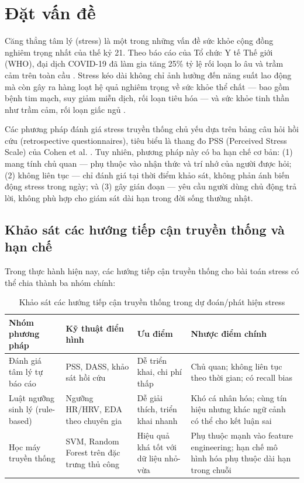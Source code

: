 \section{Đặt vấn đề}
\label{sec:dat_van_de}

Căng thẳng tâm lý (stress) là một trong những vấn đề sức khỏe cộng đồng nghiêm trọng nhất của thế kỷ 21. Theo báo cáo của Tổ chức Y tế Thế giới (WHO), đại dịch COVID-19 đã làm gia tăng 25\% tỷ lệ rối loạn lo âu và trầm cảm trên toàn cầu \cite{who2022mental}. Stress kéo dài không chỉ ảnh hưởng đến năng suất lao động mà còn gây ra hàng loạt hệ quả nghiêm trọng về sức khỏe thể chất — bao gồm bệnh tim mạch, suy giảm miễn dịch, rối loạn tiêu hóa — và sức khỏe tinh thần như trầm cảm, rối loạn giấc ngủ \cite{chrousos2009stress}.

Các phương pháp đánh giá stress truyền thống chủ yếu dựa trên bảng câu hỏi hồi cứu (retrospective questionnaires), tiêu biểu là thang đo PSS (Perceived Stress Scale) của Cohen et al. \cite{cohen1983global}. Tuy nhiên, phương pháp này có ba hạn chế cơ bản: (1) mang tính chủ quan — phụ thuộc vào nhận thức và trí nhớ của người được hỏi; (2) không liên tục — chỉ đánh giá tại thời điểm khảo sát, không phản ánh biến động stress trong ngày; và (3) gây gián đoạn — yêu cầu người dùng chủ động trả lời, không phù hợp cho giám sát dài hạn trong đời sống thường nhật.

\subsection{Khảo sát các hướng tiếp cận truyền thống và hạn chế}
\label{subsec:traditional_approaches}

Trong thực hành hiện nay, các hướng tiếp cận truyền thống cho bài toán stress có thể chia thành ba nhóm chính:

\begin{table}[H]
\centering
\caption{Khảo sát các hướng tiếp cận truyền thống trong dự đoán/phát hiện stress}
\label{tab:traditional_methods_stress}
\small
\begin{tabular}{|p{3.2cm}|p{3.8cm}|p{2.8cm}|p{4.0cm}|}
\hline
\textbf{Nhóm phương pháp} & \textbf{Kỹ thuật điển hình} & \textbf{Ưu điểm} & \textbf{Nhược điểm chính} \\
\hline
Đánh giá tâm lý tự báo cáo & PSS, DASS, khảo sát hồi cứu \cite{cohen1983global} & Dễ triển khai, chi phí thấp & Chủ quan; không liên tục theo thời gian; có recall bias \\
\hline
Luật ngưỡng sinh lý (rule-based) & Ngưỡng HR/HRV, EDA theo chuyên gia \cite{chrousos2009stress} & Dễ giải thích, triển khai nhanh & Khó cá nhân hóa; cùng tín hiệu nhưng khác ngữ cảnh có thể cho kết luận sai \\
\hline
Học máy truyền thống & SVM, Random Forest trên đặc trưng thủ công \cite{hovsepian2015cstress, schmidt2018wesad} & Hiệu quả khá tốt với dữ liệu nhỏ-vừa & Phụ thuộc mạnh vào feature engineering; hạn chế mô hình hóa phụ thuộc dài hạn trong chuỗi \\
\hline
\end{tabular}
\end{table}


